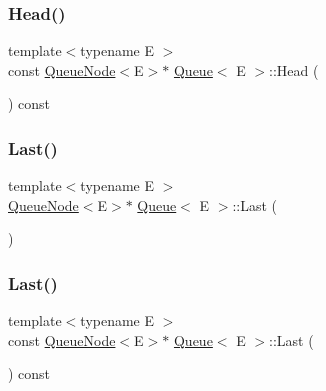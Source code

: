 \mbox{\label{classQueue_a6c906075e0ad2d1f0634990aa106395e}} 
\subsubsection{\texorpdfstring{Head()}{Head()}\hspace{0.1cm}{\footnotesize\ttfamily [2/2]}}
{\footnotesize\ttfamily template$<$typename E $>$ \\
const \mbox{\hyperlink{classQueueNode}{Queue\+Node}}$<$E$>$$\ast$ \mbox{\hyperlink{classQueue}{Queue}}$<$ E $>$\+::Head (\begin{DoxyParamCaption}{ }\end{DoxyParamCaption}) const\hspace{0.3cm}{\ttfamily [inline]}}

\mbox{\label{classQueue_a430aca3d3b9f5fd588b215028d134b74}} 
\subsubsection{\texorpdfstring{Last()}{Last()}\hspace{0.1cm}{\footnotesize\ttfamily [1/2]}}
{\footnotesize\ttfamily template$<$typename E $>$ \\
\mbox{\hyperlink{classQueueNode}{Queue\+Node}}$<$E$>$$\ast$ \mbox{\hyperlink{classQueue}{Queue}}$<$ E $>$\+::Last (\begin{DoxyParamCaption}{ }\end{DoxyParamCaption})\hspace{0.3cm}{\ttfamily [inline]}}

\mbox{\label{classQueue_a7c8c2c64700dfe1df8bf266572cf101a}} 
\subsubsection{\texorpdfstring{Last()}{Last()}\hspace{0.1cm}{\footnotesize\ttfamily [2/2]}}
{\footnotesize\ttfamily template$<$typename E $>$ \\
const \mbox{\hyperlink{classQueueNode}{Queue\+Node}}$<$E$>$$\ast$ \mbox{\hyperlink{classQueue}{Queue}}$<$ E $>$\+::Last (\begin{DoxyParamCaption}{ }\end{DoxyParamCaption}) const\hspace{0.3cm}{\ttfamily [inline]}}

